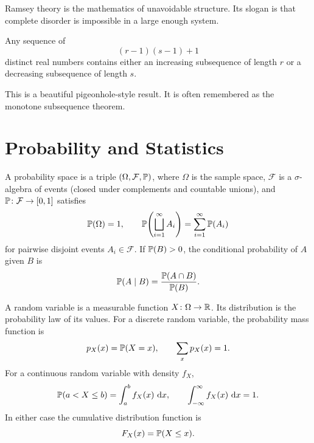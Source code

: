     \begin{remark}
        Ramsey theory is the mathematics of unavoidable structure. Its slogan
        is that complete disorder is impossible in a large enough system.
    \end{remark}

    \begin{theorem}
        Any sequence of
        \[
            (r-1)(s-1)+1
        \]
        distinct real numbers contains either an increasing subsequence of
        length $r$ or a decreasing subsequence of length $s$.
    \end{theorem}

    \begin{remark}
        This is a beautiful pigeonhole-style result. It is often remembered as
        the monotone subsequence theorem.
    \end{remark}

    \chapter{Probability and Statistics}



    \begin{definition}
        A probability space is a triple $(\Omega,\mathcal{F},\mathbb{P})$, where
        $\Omega$ is the sample space, $\mathcal{F}$ is a $\sigma$-algebra of
        events (closed under complements and countable unions), and
        $\mathbb{P}\colon \mathcal{F}\to[0,1]$ satisfies
        \[
            \mathbb{P}(\Omega)=1,
            \qquad
            \mathbb{P}\!\left(\bigsqcup_{i=1}^{\infty}A_i\right)
            =
            \sum_{i=1}^{\infty}\mathbb{P}(A_i)
        \]
        for pairwise disjoint events $A_i\in\mathcal{F}$. If
        $\mathbb{P}(B)>0$, the conditional probability of $A$ given $B$ is
        \[
            \mathbb{P}(A\mid B)
            =
            \frac{\mathbb{P}(A\cap B)}{\mathbb{P}(B)}.
        \]
    \end{definition}

    \begin{definition}
        A random variable is a measurable function $X\colon \Omega\to\mathbb{R}$. Its
        distribution is the probability law of its values. For a discrete
        random variable, the probability mass function is
        \[
            p_X(x)=\mathbb{P}(X=x),
            \qquad
            \sum_x p_X(x)=1.
        \]
        For a continuous random variable with density $f_X$,
        \[
            \mathbb{P}(a<X\leq b)=\int_a^b f_X(x)\,\mathop{}\!\mathrm{d} x,
            \qquad
            \int_{-\infty}^{\infty}f_X(x)\,\mathop{}\!\mathrm{d} x=1.
        \]
        In either case the cumulative distribution function is
        \[
            F_X(x)=\mathbb{P}(X\leq x).
        \]
    \end{definition}

